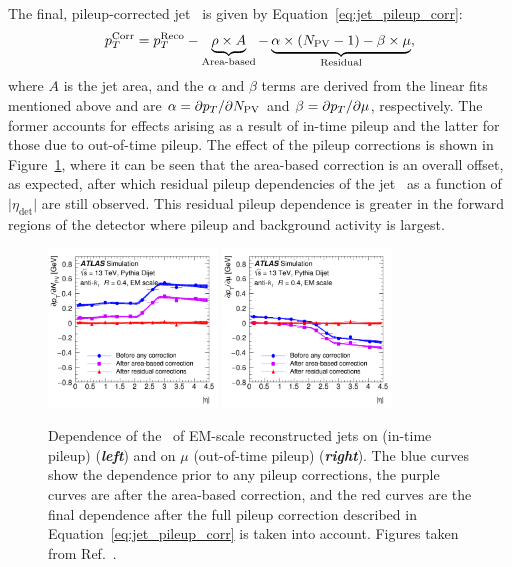 The final, pileup-corrected jet \pT~is given by Equation~\ref{eq:jet_pileup_corr}:
\begin{align}
    p_{T}^{\text{Corr}} = p_{T}^{\text{Reco}} - \underbrace{\rho \times A}_{\text{Area-based}} - \underbrace{\alpha \times (N_{\text{PV}} - 1) - \beta \times \mu}_{\text{Residual}},
    \label{eq:jet_pileup_corr}
\end{align}
where $A$ is the jet area, and the $\alpha$ and $\beta$ terms are derived from the linear fits mentioned above and are $\alpha = \partial p_{T} / \partial N_{\text{PV}}$
and $\beta = \partial p_{T} / \partial \mu$, respectively.
The former accounts for effects arising as a result of in-time pileup and the latter for those due to out-of-time pileup.
The effect of the pileup corrections is shown in Figure~\ref{fig:jet_pileup_corr}, where it can be seen that the area-based correction
is an overall offset, as expected, after which residual pileup dependencies of the jet \pT~as a function of $\lvert \eta_{\text{det}} \rvert$ are still observed.
This residual pileup dependence is greater in the forward regions of the detector where pileup and background activity is largest.

\begin{figure}[!htb]
    \begin{center}
        \includegraphics[width=0.4\textwidth]{figures/chapter3/jets/jet_pileup_corr_alpha}
        \includegraphics[width=0.4\textwidth]{figures/chapter3/jets/jet_pileup_corr_beta}
        \caption{
            Dependence of the \pT~of EM-scale reconstructed jets on \npv (in-time pileup) (\textbf{\textit{left}}) and on
            $\mu$ (out-of-time pileup) (\textbf{\textit{right}}).
            The blue curves show the dependence prior to any pileup corrections,
            the purple curves are after the area-based correction,
            and the red curves are the final dependence after the full pileup correction described in Equation~\ref{eq:jet_pileup_corr}
            is taken into account.
            Figures taken from Ref.~\cite{Aaboud:2017jcu}.
        }
        \label{fig:jet_pileup_corr}
    \end{center}
\end{figure}

